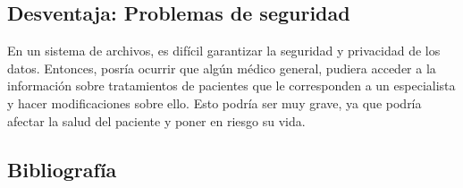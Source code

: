 \vsapace{0.3cm}

\subsection*{\textcolor{unamblue}{Desventaja: Problemas de seguridad}}
En un sistema de archivos, es difícil garantizar la seguridad y privacidad de los datos. Entonces, posría ocurrir que algún médico general, pudiera acceder a la información sobre tratamientos de pacientes que le corresponden a un especialista y hacer modificaciones sobre ello.
Esto podría ser muy grave, ya que podría afectar la salud del paciente y poner en riesgo su vida.

\vspace{0.3cm}

\subsection*{Bibliografía}
\nocite{dbconcepts}




